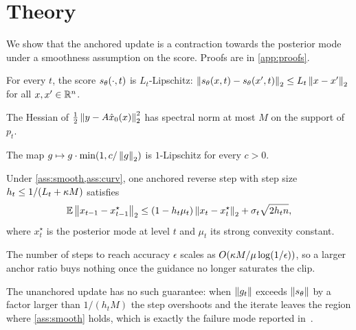 \section{Theory}
\label{sec:theory}
We show that the anchored update is a contraction towards the posterior mode under a smoothness assumption on the score. Proofs are in \cref{app:proofs}.

\begin{assumption}
\label{ass:smooth}
For every $t$, the score $s_\theta(\cdot, t)$ is $L_t$-Lipschitz: $\left\lVert s_\theta(x, t) - s_\theta(x', t) \right\rVert_2 \le L_t \left\lVert x - x' \right\rVert_2$ for all $x, x' \in \mathbb{R}^n$.
\end{assumption}

\begin{assumption}
\label{ass:curv}
The Hessian of $\tfrac12 \left\lVert y - A \hat{x}_0(x) \right\rVert_2^2$ has spectral norm at most $M$ on the support of $p_t$.
\end{assumption}

\begin{lemma}
\label{lem:nonexp}
The map $g \mapsto g \cdot \min(1, c / \left\lVert g \right\rVert_2)$ is $1$-Lipschitz for every $c > 0$.
\end{lemma}

\begin{theorem}[Contraction]
\label{thm:contraction}
Under \cref{ass:smooth,ass:curv}, one anchored reverse step with step size $h_t \le 1 / (L_t + \kappa M)$ satisfies
\begin{equation}
  \mathbb{E} \left\lVert x_{t-1} - x^\star_{t-1} \right\rVert_2 \le (1 - h_t \mu_t) \left\lVert x_t - x^\star_t \right\rVert_2 + \sigma_t \sqrt{2 h_t n},
  \label{eq:contraction}
\end{equation}
where $x^\star_t$ is the posterior mode at level $t$ and $\mu_t$ its strong convexity constant.
\end{theorem}

\begin{corollary}
\label{cor:budget}
The number of steps to reach accuracy $\epsilon$ scales as $O(\kappa M / \mu \log(1/\epsilon))$, so a larger anchor ratio buys nothing once the guidance no longer saturates the clip.
\end{corollary}

The unanchored update has no such guarantee: when $\left\lVert g_t \right\rVert$ exceeds $\left\lVert s_\theta \right\rVert$ by a factor larger than $1/(h_t M)$ the step overshoots and the iterate leaves the region where \cref{ass:smooth} holds, which is exactly the failure mode reported in~\cite{morales2023}.
